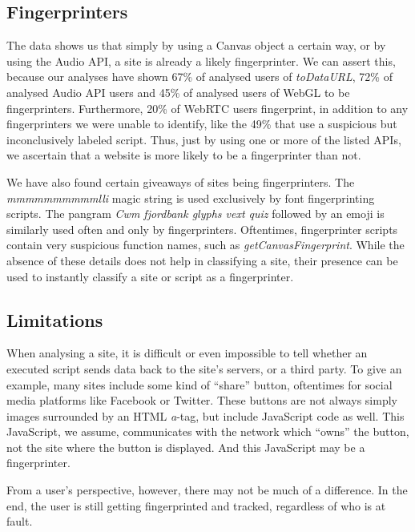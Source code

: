 \documentclass[
    fontsize=12pt,
    headings=small,
    parskip=half,
    bibliography=totoc,
    numbers=noenddot,
    open=any
    ]{scrreprt}
\begin{document}
\subsection{Fingerprinters}
The data shows us that simply by using a Canvas object a certain way, or by using the Audio API,
a site is already a likely fingerprinter. We can assert this, because our analyses have shown
67\% of analysed users of \textit{toDataURL}, 72\% of analysed Audio API users and 45\%
of analysed users of WebGL to be fingerprinters.
Furthermore, 20\% of WebRTC users fingerprint, in addition to any fingerprinters we were unable
to identify, like the 49\% that use a suspicious but inconclusively labeled script.
Thus, just by using one or more of the listed APIs, we ascertain that a website is more likely
to be a fingerprinter than not.

We have also found certain giveaways of sites being fingerprinters.
The \textit{mmmmmmmmmmlli} magic string is used exclusively by font fingerprinting scripts.
The pangram \textit{Cwm fjordbank glyphs vext quiz} followed by an emoji is similarly used often
and only by fingerprinters.
Oftentimes, fingerprinter scripts contain very suspicious function names, such as \textit{getCanvasFingerprint}.
While the absence of these details does not help in classifying a site,
their presence can be used to instantly classify a site or script as a fingerprinter.


\subsection{Limitations}
When analysing a site, it is difficult or even impossible to tell whether an executed
script sends data back to the site's servers, or a third party.
To give an example, many sites include some kind of ``share'' button,
oftentimes for social media platforms like Facebook or Twitter.
These buttons are not always simply images surrounded by an HTML \textit{a}-tag,
but include JavaScript code as well.
This JavaScript, we assume, communicates with the network which ``owns''
the button, not the site where the button is displayed.
And this JavaScript may be a fingerprinter.

From a user's perspective, however, there may not be much of a difference.
In the end, the user is still getting fingerprinted and tracked, regardless
of who is at fault.


\end{document}
